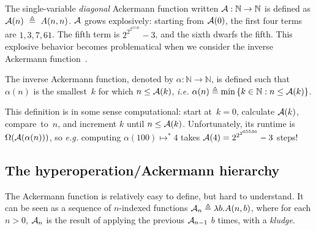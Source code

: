 \noindent The single-variable \emph{diagonal} Ackermann function written $\mathcal{A} : \mathbb{N} \to \mathbb{N}$ is defined as $\mathcal{A}(n)~\triangleq~A(n, n)$.  
$\mathcal{A}$ grows explosively: starting from $\mathcal{A}(0)$, the first four terms are $1, 3, 7, 61$.  The fifth term is $2^{2^{2^{65536}}}-3$, and the sixth dwarfs the fifth.
This explosive behavior becomes problematical when we consider
the inverse Ackermann function~\cite{chazelle,tarjan}.
\begin{defn} \label{defn: inv_ack}
The inverse Ackermann function, denoted by $\alpha: \mathbb{N}\to \mathbb{N}$, is defined such that $\alpha(n)$ is the smallest~$k$ for
which $n \le \mathcal{A}(k)$, \emph{i.e.} $\alpha(n) \triangleq \min\left\{k\in \mathbb{N} : n \le \mathcal{A}(k)\right\}$.
\end{defn}
\noindent This definition is in some sense computational: start at~\mbox{$k=0$}, calculate $\mathcal{A}(k)$,
compare~to~$n$, and increment $k$ until \mbox{$n \le \mathcal{A}(k)$}.
Unfortunately, its runtime is $\Omega(\mathcal{A}(\alpha(n)))$,
so \emph{e.g.} computing $\alpha(100) \mapsto^{*} 4$ takes
$\mathcal{A}(4) = 2^{2^{2^{65536}}}-3$ steps!

\subsection{The hyperoperation/Ackermann hierarchy}

The Ackermann function is relatively easy to define, but hard to
understand.  It can be seen as
a sequence of $n$-indexed functions $\mathcal{A}_n \triangleq \lambda b.A(n,b)$, where for each $n>0$, $\mathcal{A}_n$ is the result of applying the previous $\mathcal{A}_{n-1}$ $b$ times, with a 
\emph{kludge}.

